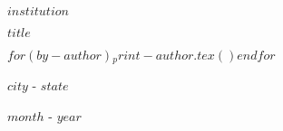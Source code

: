 \thispagestyle{empty}

\begin{center}
$institution$
\end{center}


\vspace{4cm}

\begin{center}
    \textbf{$title$}
\end{center}

\vspace{4cm}
\hypersetup{
    urlcolor=black,
    linkcolor=black
}

\begin{center}
$for(by-author)$$_print-author.tex()$$endfor$
\end{center}


\vspace{3.5cm}

\begin{center}

$city$ - $state$

$month$ - $year$
    
\end{center}

\newpage

\renewcommand{\listfigurename}{LISTA DE FIGURAS}
\pagestyle{fancy}
\listoffigures


\newpage
\renewcommand{\contentsname}{SUMÁRIO}
\pagestyle{fancy}
\tableofcontents

\newpage
{}

